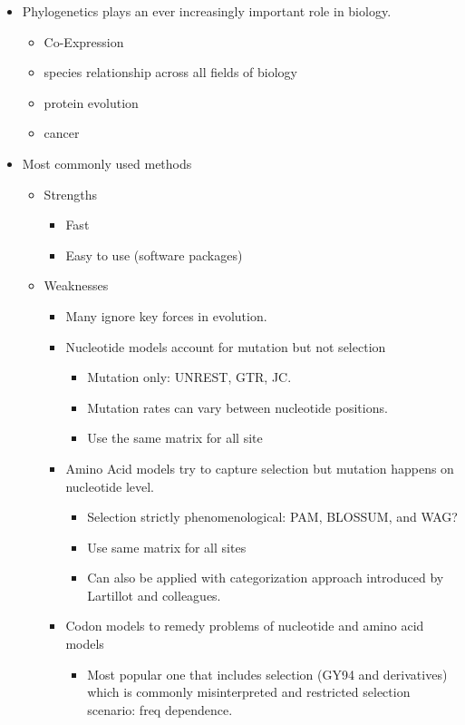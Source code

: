 \documentclass[12pt]{article}
\begin{document}
\begin{itemize}
	\item Phylogenetics plays an ever increasingly important role in biology.
	\begin{itemize}
		\item Co-Expression
		\item species relationship across all fields of biology
		\item protein evolution
		\item cancer
	\end{itemize}
	\item Most commonly used methods
	\begin{itemize}
		\item Strengths
		\begin{itemize}
			\item Fast
			\item Easy to use (software packages)
		\end{itemize}
		\item Weaknesses
		\begin{itemize}
			\item Many ignore key forces in evolution.
			\item Nucleotide models account for mutation but not selection
			\begin{itemize}
				\item Mutation only: UNREST, GTR, JC.
				\item Mutation rates can vary between nucleotide positions.
				\item Use the same matrix for all site
			\end{itemize}
			\item Amino Acid models try to capture selection but mutation happens on nucleotide level.
			\begin{itemize}
				\item Selection strictly phenomenological: PAM, BLOSSUM, and WAG?
				\item Use same matrix for all sites
				\item Can also be applied with categorization approach introduced by Lartillot and colleagues.
			\end{itemize}
			\item Codon models to remedy problems of nucleotide and amino acid models
			\begin{itemize}
				\item Most popular one that includes selection (GY94 and derivatives) which is commonly misinterpreted and restricted selection scenario: freq dependence.

\end{itemize}
\end{itemize}
\end{itemize}
\end{itemize}
\end{document}
